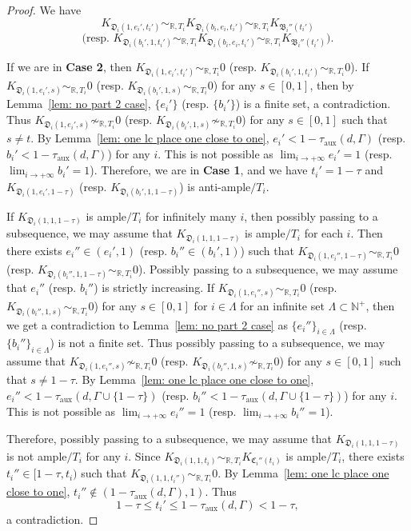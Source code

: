 \documentclass[11pt,reqno]{amsart}
\numberwithin{equation}{section}
\newcommand{\Dd}{{\mathfrak{D}}}
\newcommand{\Cc}{\mathfrak{C}}
\newcommand{\aux}{\operatorname{aux}}
\newcommand{\Bb}{{\mathfrak{B}}}
\newcommand{\Ii}{\Gamma}
\theoremstyle{definition}
\begin{document}
\begin{proof}
We have
$$K_{\Dd_i(1,e_i',t_i')}\sim_{\mathbb R,T_i}K_{\Dd_i(b_i,e_i,t_i')}\sim_{\mathbb R,T_i}K_{\Bb_i''(t_i')}$$
$$\text{(resp. }K_{\Dd_i(b_i',1,t_i')}\sim_{\mathbb R,T_i}K_{\Dd_i(b_i,e_i,t_i')}\sim_{\mathbb R,T_i}K_{\Bb_i''(t_i')}\text{)}.$$

If we are in \textbf{Case 2}, then $K_{\Dd_i(1,e_i',t_i')}\sim_{\mathbb R,T_i}0$ (resp. $K_{\Dd_i(b_i',1,t_i')}\sim_{\mathbb R,T_i}0$). If $K_{\Dd_i(1,e_i',s)}\sim_{\mathbb R,T_i}0$ (resp. $K_{\Dd_i(b_i',1,s)}\sim_{\mathbb R,T_i}0$) for any $s\in [0,1]$, then by Lemma~\ref{lem: no part 2 case}, $\{e_i'\}$ (resp. $\{b_i'\}$) is a finite set, a contradiction. Thus $K_{\Dd_i(1,e_i',s)}\not\sim_{\mathbb R,T_i}0$ (resp. $K_{\Dd_i(b_i',1,s)}\not\sim_{\mathbb R,T_i}0$) for any $s\in [0,1]$ such that $s\neq t$. By Lemma~\ref{lem: one lc place one close to one}, $e_i'<1-\tau_{\aux}(d,\Ii)$ (resp. $b_i'<1-\tau_{\aux}(d,\Ii)$) for any $i$. This is not possible as $\lim_{i\rightarrow+\infty}e_i'=1$ (resp. $\lim_{i\rightarrow+\infty}b_i'=1$). Therefore, we are in \textbf{Case 1}, and we have $t_i'=1-\tau$ and $K_{\Dd_i(1,e_i',1-\tau)}$ (resp. $K_{\Dd_i(b_i',1,1-\tau)}$) is anti-ample$/T_i$. 

If $K_{\Dd_i(1,1,1-\tau)}$ is ample$/T_i$ for infinitely many $i$, then possibly passing to a subsequence, we may assume that $K_{\Dd_i(1,1,1-\tau)}$ is ample$/T_i$ for each $i$. Then there exists $e_i''\in (e_i',1)$ (resp. $b_i''\in (b_i',1)$) such that $K_{\Dd_i(1,e_i'',1-\tau)}\sim_{\mathbb R,T_i}0$ (resp. $K_{\Dd_i(b_i'',1,1-\tau)}\sim_{\mathbb R,T_i}0$). Possibly passing to a subsequence, we may assume that $e_i''$ (resp. $b_i''$) is strictly increasing. If $K_{\Dd_i(1,e_i'',s)}\sim_{\mathbb R,T_i}0$ (resp. $K_{\Dd_i(b_i'',1,s)}\sim_{\mathbb R,T_i}0$) for any $s\in [0,1]$ for $i\in\Lambda$ for an infinite set $\Lambda\subset\mathbb N^+$, then we get a contradiction to Lemma~\ref{lem: no part 2 case} as $\{e_i''\}_{i\in\Lambda}$ (resp.  $\{b_i''\}_{i\in\Lambda}$) is not a finite set. Thus possibly passing to a subsequence, we may assume that $K_{\Dd_i(1,e_i'',s)}\not\sim_{\mathbb R,T_i}0$ (resp. $K_{\Dd_i(b_i'',1,s)}\not\sim_{\mathbb R,T_i}0$) for any $s\in [0,1]$ such that $s\neq1-\tau$. By Lemma~\ref{lem: one lc place one close to one}, $e_i''<1-\tau_{\aux}(d,\Ii\cup\{1-\tau\})$ (resp. $b_i''<1-\tau_{\aux}(d,\Ii\cup\{1-\tau\})$) for any $i$. This is not possible as $\lim_{i\rightarrow+\infty}e_i''=1$ (resp. $\lim_{i\rightarrow+\infty}b_i''=1$). 

Therefore, possibly passing to a subsequence, we may assume that $K_{\Dd_i(1,1,1-\tau)}$ is not ample$/T_i$ for any $i$. Since $K_{\Dd_i(1,1,t_i)}\sim_{\mathbb R,T_i}K_{\Cc_i''(t_i)}$ is ample$/T_i$, there exists $t_i''\in [1-\tau,t_i)$ such that $K_{\Dd_i(1,1,t_i'')}\sim_{\mathbb R,T_i}0$. By Lemma~\ref{lem: one lc place one close to one}, $t_i''\not\in (1-\tau_{\aux}(d,\Ii),1)$. Thus
$$1-\tau\leq t_i'\leq 1-\tau_{\aux}(d,\Ii)<1-\tau,$$
a contradiction.


\end{proof}
\end{document}
